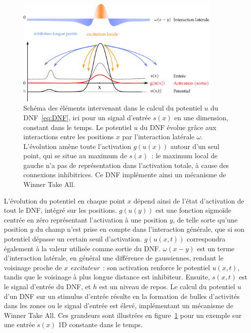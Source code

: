 \documentclass[../main]{subfiles}
\begin{document}
\begin{figure}
	\centering\includegraphics[width=0.9\textwidth]{DNF.pdf}
	\caption{Schéma des éléments intervenant dans le calcul du potentiel $u$ du DNF~\ref{eq:DNF}, ici pour un signal d'entrée $s(x)$ en une dimension, constant dans le temps.
	Le potentiel $u$ du DNF évolue grâce aux interactions entre les positions $x$ par l'interaction latérale $\omega$.
	L'évolution amène toute l'activation $g(u(x))$ autour d'un seul point, qui se situe au maximum de $s(x)$~: le maximum local de gauche n'a pas de représentation dans l'activation totale, à cause des connexions inhibitrices.
	Ce DNF implémente ainsi un mécanisme de Winner Take All. \label{fig:DNF}
	}
\end{figure}

L'évolution du potentiel en chaque point $x$ dépend ainsi de l'état d'activation de tout le DNF, intégré sur les positions. $g(u(y))$ est une fonction sigmoïde centrée en zéro représentant l'activation à une position $y$, de telle sorte qu'une position $y$ du champ n'est prise en compte dans l'interaction générale, que si son potentiel dépasse un certain seuil d'activation. $g(u(x,t))$ correspondra également à la valeur utilisée comme sortie du DNF.
$\omega(x-y)$ est un terme d'interaction latérale, en général une différence de gaussiennes, rendant le voisinage proche de $x$ \emph{excitateur}~: son activation renforce le potentiel $u(x,t)$, tandis que le voisinage à plus longue distance est inhibiteur. 
Ensuite, $s(x,t)$ est le signal d'entrée du DNF, et $h$ est un niveau de repos.
Le calcul du potentiel $u$ d'un DNF sur un stimulus d'entrée résulte en la formation de bulles d'activités dans les zones ou le signal d'entrée est élevé, implémentant un mécanisme de Winner Take All.
Ces grandeurs sont illustrées en figure~\ref{fig:DNF} pour un exemple sur une entrée $s(x)$ 1D constante dans le temps.
\end{document}
